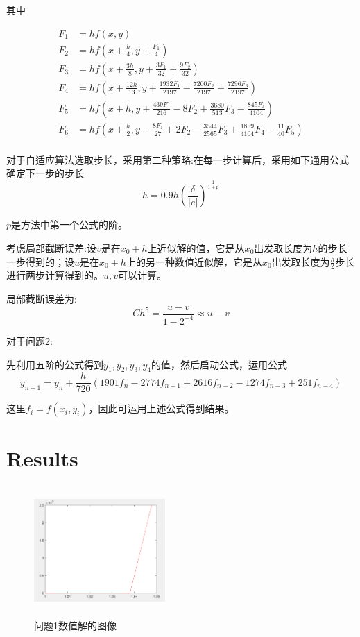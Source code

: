 \documentclass{article}
\begin{document}
其中 

	\begin{align*}
	F_1 &= hf(x,y) \\
	F_2 &= hf(x+\frac{h}{4},y+\frac{F_1}{4})\\
	F_3 &= hf(x+\frac{3h}{8},y+\frac{3F_1}{32}+\frac{9F_2}{32})\\
	F_4 &= hf(x+\frac{12h}{13},y+\frac{1932F_1}{2197}-\frac{7200F_2}{2197}+\frac{7296F_3}{2197})\\
	F_5 &= hf(x+h,y+\frac{439F_1}{216}-8F_2+\frac{3680}{513}F_3-\frac{845F_4}{4104})\\
	F_6 &= hf(x+\frac{h}{2},y-\frac{8F_1}{27}+2F_2-\frac{3544}{2565}F_3+\frac{1859}{4104}F_4-\frac{11}{40}F_5)\\
   \end{align*}

  对于自适应算法选取步长，采用第二种策略:在每一步计算后，采用如下通用公式确定下一步的步长
  $$ h=0.9h(\frac{\delta}{|e|})^{\frac{1}{1+p}}  $$
  
  $p$是方法中第一个公式的阶。
  
  考虑局部截断误差:设$v$是在$x_0+h$上近似解的值，它是从$x_0$出发取长度为$h$的步长一步得到的；设$u$是在$x_0+h$上的另一种数值近似解，它是从$x_0$出发取长度为$\frac{h}{2}$步长进行两步计算得到的。$u,v$可以计算。
  
  局部截断误差为:
  $$  Ch^5=\frac{u-v}{1-2^{-4}} \approx u-v $$
  
  对于问题2:
  
  先利用五阶的公式得到$y_1,y_2,y_3,y_4$的值，然后启动公式，运用公式
  $$ y_{n+1}=y_n+\frac{h}{720}(1901f_n-2774f_{n-1}+2616f_{n-2}-1274f_{n-3}+251f_{n-4})$$
  
  这里$f_i=f(x_i,y_i)$，因此可运用上述公式得到结果。
  
  
	\section{Results}
	
		\begin{figure}[H]
		\begin{center}
			
			\includegraphics[width=5cm,height=5cm]{RKF54}
			
			\caption{问题1数值解的图像} \label{RKF54.label}
		\end{center}
	\end{figure}
	
\end{document}
